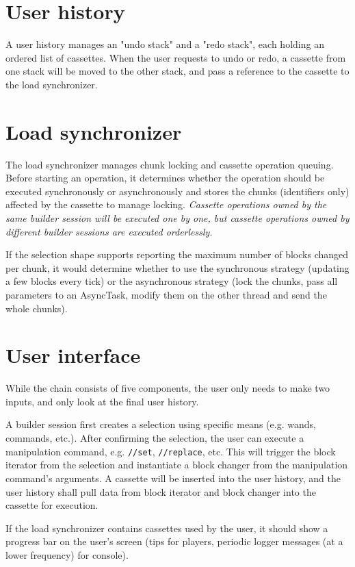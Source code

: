 \documentclass{report}
\begin{document}
			\section{User history}
				A user history manages an "undo stack" and a "redo stack", each holding an ordered list of cassettes.
				When the user requests to undo or redo, a cassette from one stack will be moved to the other stack, and
				pass a reference to the cassette to the load synchronizer.

			\section{Load synchronizer}
				The load synchronizer manages chunk locking and cassette operation queuing. Before starting an
				operation, it determines whether the operation should be executed synchronously or asynchronously and
				stores the chunks (identifiers only) affected by the cassette to manage locking. \emph{Cassette
				operations owned by the same builder session will be executed one by one, but cassette operations owned
				by different builder sessions are executed orderlessly.}

				If the selection shape supports reporting the maximum number of blocks changed per chunk, it would
				determine whether to use the synchronous strategy (updating a few blocks every tick) or the
				asynchronous strategy (lock the chunks, pass all parameters to an AsyncTask, modify them on the other
				thread and send the whole chunks).

			\section{User interface}
				While the chain consists of five components, the user only needs to make two inputs, and only look at
				the final user history.

				A builder session first creates a selection using specific means (e.g. wands, commands, etc.). After
				confirming the selection, the user can execute a manipulation command, e.g. \texttt{//set},
				\texttt{//replace}, etc. This will trigger the block iterator from the selection and instantiate a
				block changer from the manipulation command's arguments. A cassette will be inserted into the user
				history, and the user history shall pull data from block iterator and block changer into the cassette
				for execution.

				If the load synchronizer contains cassettes used by the user, it should show a progress bar on the
				user's screen (tips for players, periodic logger messages (at a lower frequency) for console).
\end{document}
